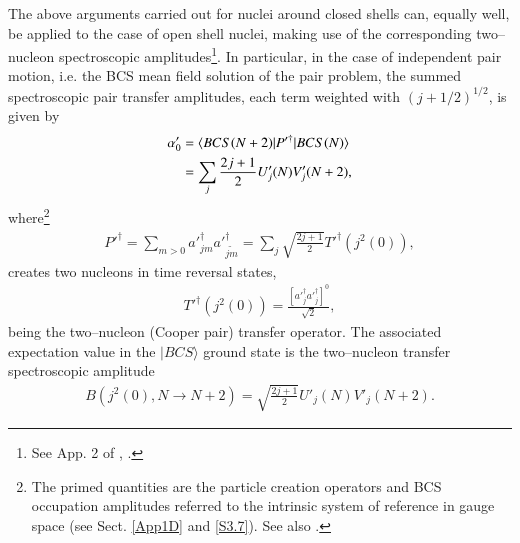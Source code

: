 The above arguments carried out for nuclei around closed shells can,  equally well, be applied to the case of open shell nuclei, making use of the corresponding two--nucleon spectroscopic amplitudes\footnote{See App. 2 of \cite{Broglia:73}, \cite{Yoshida:62}.}.
In particular, in the case of independent pair motion, i.e. the BCS mean field solution of the pair problem, the summed spectroscopic pair transfer amplitudes, each term weighted with $(j+1/2)^{1/2}$, is given by
\begin{align}\label{eq1.2.14}
\nonumber \alpha_0'&=\langle {BCS(N+2)|P'^\dagger|BCS(N)} \rangle\\
&=\sum_{j}\frac{2j+1}{2}U'_j(N)V'_j(N+2),
\end{align}
where\footnote{The primed quantities are the particle creation operators and BCS occupation amplitudes referred to the intrinsic system of reference in gauge space (see Sect. \ref{App1D} and \ref{S3.7}). See also \cite{Potel:13b}.}
\begin{align}\label{eq1.2.15}
P'^\dagger=\sum_{m>0}a'^\dagger_{jm}a'^\dagger_{\widetilde{jm}}=\sum_j\sqrt{\frac{2j+1}{2}}T'^{\dagger}(j^2(0)),
\end{align}
creates two nucleons in time reversal states, 
\begin{align}\label{eq1.2.16}
T'^{\dagger}(j^2(0))=\frac{\left[a'^\dagger_ja'^\dagger_j\right]^0}{\sqrt{2}},
\end{align}
being the two--nucleon (Cooper pair) transfer operator. The associated expectation value in the $|BCS\rangle$ ground state is the two--nucleon transfer spectroscopic amplitude  
\begin{align}\label{eq1.2.17}
B(j^2(0),N\to N+2)=\sqrt{\frac{2j+1}{2}}U'_j(N)V'_j(N+2).
\end{align}
